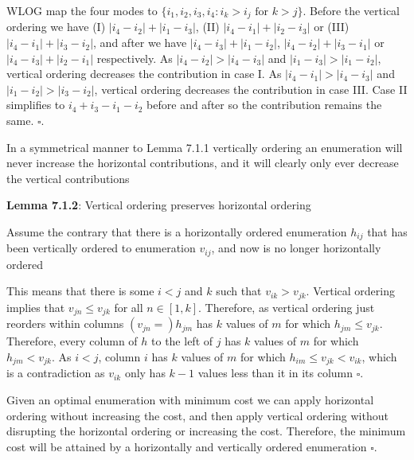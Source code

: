 \documentclass[twoside]{article}
\begin{document}
\begin{itemlist}
\begin{alphlist}
\begin{romanlist}
                               \item WLOG map the four modes to $\{i_1,i_2,i_3,i_4: i_k > i_j \text{ for } k>j\}$. Before the vertical ordering we have (I) $|i_4-i_2| + |i_1- i_3|$, (II) $|i_4 - i_1| + |i_2 - i_3|$ or (III) $|i_4 - i_1| + |i_3- i_2|$, and after we have $|i_4-i_3| + |i_1-i_2|$, $|i_4-i_2| +  |i_3 - i_1|$ or $|i_4 - i_3| + |i_2 - i_1|$ respectively. As $|i_4-i_2| > |i_4-i_3|$ and $|i_1-i_3|>|i_1-i_2|$, vertical ordering decreases the contribution in case I. As $|i_4-i_1| > |i_4-i_3|$ and $|i_1-i_2|>|i_3-i_2|$, vertical ordering decreases the contribution in case III. Case II simplifies to $i_4 +i_3 - i_1 - i_2$ before and  after so the contribution remains the same. $\square.$
                               \end{romanlist}
                       \item In a symmetrical manner to Lemma 7.1.1 vertically ordering an enumeration will never increase the horizontal contributions, and it will clearly only ever decrease the vertical contributions
                       \item \textbf{Lemma 7.1.2}: Vertical ordering preserves horizontal ordering
                               \begin{romanlist}
                               \item  Assume the contrary that there is a horizontally ordered enumeration $h_{ij}$ that has been vertically ordered to enumeration $v_{ij}$, and now is no longer horizontally ordered
                               \item This means that there is some $i<j$ and $k$ such that $v_{ik} > v_{jk}$. Vertical ordering implies that $v_{jn} \leq v_{jk}$ for all $n \in [1,k]$. Therefore, as vertical ordering just reorders within columns $(v_{jn}=)h_{jm}$ has $k$ values of $m$ for which $h_{jm} \leq v_{jk}$. Therefore, every column of $h$ to the left of $j$ has $k$ values of $m$ for which $h_{jm} < v_{jk}$. As $i<j$, column $i$ has $k$ values of $m$ for which $h_{im} \leq v_{jk} < v_{ik}$, which is a contradiction as $v_{ik}$ only has $k-1$ values less than it in its column $\square.$
                       \end{romanlist}
               \item Given an optimal enumeration with minimum cost we can apply horizontal ordering without increasing the cost, and then apply vertical ordering without disrupting the horizontal ordering or increasing the cost. Therefore, the minimum cost will be attained by a horizontally and vertically ordered enumeration $\square.$

\end{alphlist}
\end{itemlist}
\end{document}
